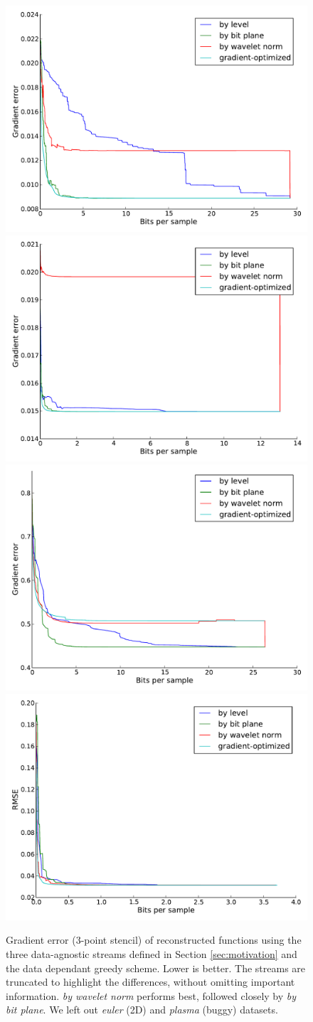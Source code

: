 \begin{figure}
  \centering
        {\includegraphics[width=0.48\linewidth]{img/motivation-3d/gradient-boiler.pdf}}
 	{\includegraphics[width=0.48\linewidth]{img/motivation-3d/gradient-diffusivity.pdf}}
 	{\includegraphics[width=0.48\linewidth]{img/motivation-3d/gradient-turbulence.pdf}}
 	{\includegraphics[width=0.48\linewidth]{img/motivation-3d/gradient-velocityz.pdf}}
 	\caption{Gradient error (3-point stencil) of reconstructed functions using the three data-agnostic streams
 	defined in Section \ref{sec:motivation} and the data dependant greedy scheme. Lower is better.
        The streams are truncated to highlight
 	the differences, without omitting important information. \emph{by wavelet norm} performs best,
 	followed closely by \emph{by bit plane}. We left out \emph{euler} (2D) and \emph{plasma} (buggy) datasets.
        }
 	\label{fig:motivation-3d-rmse}
\end{figure}

